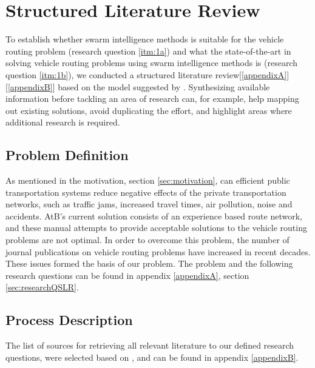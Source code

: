 \section{Structured Literature Review}
To establish whether swarm intelligence methods is suitable for the vehicle routing problem (research question \ref{itm:1a}) and what the state-of-the-art in solving vehicle routing problems using swarm intelligence methods is (research question \ref{itm:1b}), we conducted a structured literature review[\ref{appendixA}][\ref{appendixB}] based on the model suggested by \citet{kofod2014}. Synthesizing available information before tackling an area of research can, for example, help mapping out existing solutions, avoid duplicating the effort, and highlight areas where additional research is required\citep{kofod2014}. 

\subsection{Problem Definition}
As mentioned in the motivation, section \vref{sec:motivation}, can efficient public transportation systems reduce negative effects of the private transportation networks, such as traffic jams, increased travel times, air pollution, noise and accidents. AtB's current solution consists of an experience based route network, and these manual attempts to provide acceptable solutions to the vehicle routing problems are not optimal. In order to overcome this problem, the number of journal publications on vehicle routing problems have increased in recent decades. These issues formed the basis of our problem. The problem and the following research questions can be found in appendix \ref{appendixA}, section \vref{sec:researchQSLR}. 

\subsection{Process Description}
The list of sources for retrieving all relevant literature to our defined research questions, were selected based on \citep[p.3]{kofod2014}, and can be found in appendix \vref{appendixB}. 

